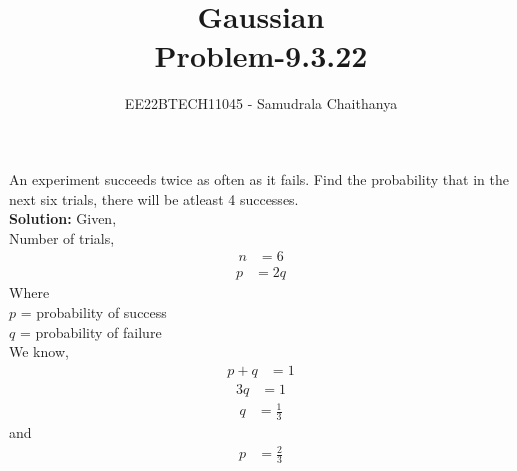 \documentclass[journal,12pt,onecolumn]{article}
\theoremstyle{remark}
\newcommand{\solution}{\noindent \textbf{Solution: }}
\begin{document}
\title{Gaussian\\ Problem-9.3.22}
\date{}
\author{EE22BTECH11045 - Samudrala Chaithanya}
\maketitle
An experiment succeeds twice as often as it fails. Find the probability that in the next six trials, there will be atleast 4 successes. \\
\solution
Given, \\Number of trials,
\begin{align}
n &= 6
\end{align}
\begin{align}
p &= 2q
\end{align}
Where\\
$p$ = probability of success\\
$q$ = probability of failure\\
We know, 
\begin{align}
p + q &= 1
\end{align}
\begin{align}
 3q &= 1
\end{align}
\begin{align}
q &= \frac{1}{3}
\end{align}
and
\begin{align}
p &= \frac{2}{3}
\end{align}
\end{document}
